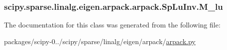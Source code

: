 \subsubsection[{M\+\_\+lu}]{\setlength{\rightskip}{0pt plus 5cm}scipy.\+sparse.\+linalg.\+eigen.\+arpack.\+arpack.\+Sp\+Lu\+Inv.\+M\+\_\+lu}\label{classscipy_1_1sparse_1_1linalg_1_1eigen_1_1arpack_1_1arpack_1_1SpLuInv_accde2c0f80f292953aa174b93149fdd6}


The documentation for this class was generated from the following file\+:\begin{DoxyCompactItemize}
\item 
packages/scipy-\/0../scipy/sparse/linalg/eigen/arpack/\hyperlink{arpack_8py}{arpack.\+py}\end{DoxyCompactItemize}
